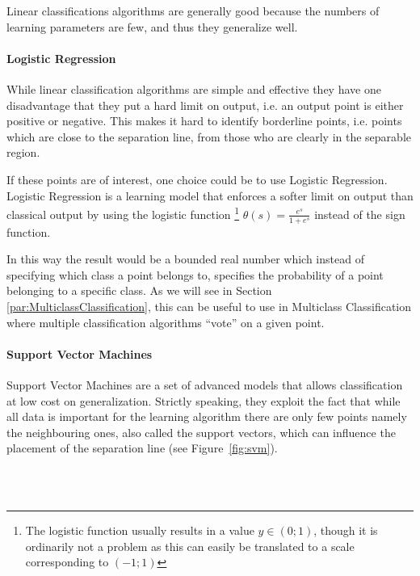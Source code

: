 Linear classifications algorithms are generally good because the numbers of learning parameters are few, and thus they generalize well.

\paragraph{Logistic Regression}
\label{par:LogisticRegression}
While linear classification algorithms are simple and effective they have one disadvantage that they put a hard limit on output,
i.e. an output point is either positive or negative.
This makes it hard to identify borderline points, i.e. points which are close to the separation line, from those who are clearly in the separable region.

If these points are of interest, one choice could be to use Logistic Regression.
Logistic Regression is a learning model that enforces a softer limit on output than classical output by using the logistic function
\footnote{The logistic function usually results in a value $y \in \left(0;1\right)$, though it is ordinarily not a problem as
this can easily be translated to a scale corresponding to $\left(-1;1\right)$}
$\theta(s) = \frac{e^s}{1+e^s}$ instead of the sign function.

In this way the result would be a bounded real number which instead of specifying which class a point belongs to, specifies the probability of a point belonging to a specific class.
As we will see in Section \ref{par:MulticlassClassification}, this can be useful to use in Multiclass Classification where multiple classification algorithms ``vote'' on a given point.
\paragraph{Support Vector Machines}
\label{par:SupportVectorMachines}

Support Vector Machines are a set of advanced models that allows classification at low cost on generalization.
Strictly speaking, they exploit the fact that while all data is important for the learning algorithm there 
are only few points namely the neighbouring ones, also called the support vectors, which can influence the placement of the separation line (see Figure~\ref{fig:svm}).

\begin{minipage}{\linewidth}
\centering
{}
\label{fig:svm}
\end{minipage}\\\\

